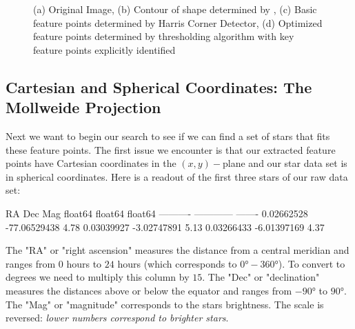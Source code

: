 \documentclass[paper=a4, fontsize=11pt]{scrartcl} %
\begin{document}
\begin{figure}
\caption{(a) Original Image, (b) Contour of shape determined by \cite{Suzuki1985}, (c) Basic feature points determined by Harris Corner Detector, (d) Optimized feature points determined by thresholding algorithm with key feature points explicitly identified}
\label{feat_detect}
\end{figure}


\subsection{Cartesian and Spherical Coordinates: The Mollweide Projection}
Next we want to begin our search to see if we can find a set of stars that fits these feature points. The first issue we encounter is that our extracted feature points have Cartesian coordinates in the $(x,y)-$plane and our star data set is in spherical coordinates. Here is a readout of the first three stars of our raw data set:
\begin{python}
	   RA         Dec        Mag  
	float64     float64    float64
	---------- ------------ -------
	0.02662528 -77.06529438    4.78
	0.03039927  -3.02747891    5.13
	0.03266433  -6.01397169    4.37
\end{python}
The "RA" or "right ascension" measures the distance from a central meridian and ranges from $0$ hours to $24$ hours (which corresponds to $0\si{\degree}-360\si{\degree}$). To convert to degrees we need to multiply this column by $15$.
The "Dec" or "declination" measures the distances above or below the equator and ranges from $-90\si{\degree}$ to $90\si{\degree}$. The "Mag" or "magnitude" corresponds to the stars brightness. The scale is reversed: \textit{lower numbers correspond to brighter stars}.
\end{document}
